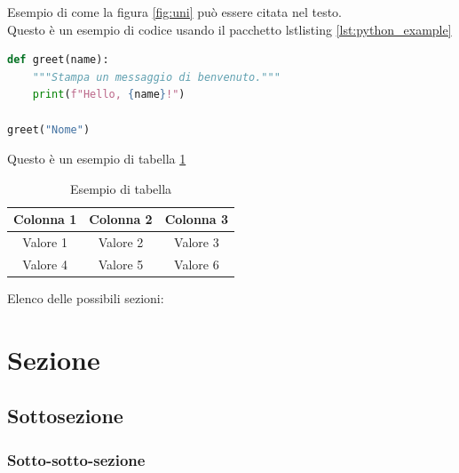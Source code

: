 Esempio di come la figura \ref{fig:uni} può essere citata nel testo.\\[8pt]

Questo è un esempio di codice usando il pacchetto lstlisting  \ref{lst:python_example}
\begin{lstlisting}[language=Python,  breaklines=true, frame=single, caption={Esempio di codice Python}, label={lst:python_example}]
def greet(name):
    """Stampa un messaggio di benvenuto."""
    print(f"Hello, {name}!")

greet("Nome")
\end{lstlisting}

Questo è un esempio di tabella \ref{tab:esempio}\\[8pt]
\begin{table}[h]
\centering
\begin{tabular}{|c|c|c|}
    \hline
    Colonna 1 & Colonna 2 & Colonna 3 \\
    \hline
    Valore 1 & Valore 2 & Valore 3 \\
    Valore 4 & Valore 5 & Valore 6 \\
    \hline
\end{tabular}
\caption{Esempio di tabella}
\label{tab:esempio}
\end{table}

Elenco delle possibili sezioni:
\section{Sezione}
\subsection{Sottosezione}
\subsubsection{Sotto-sotto-sezione}